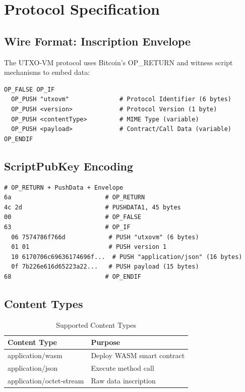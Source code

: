 \documentclass[a4paper,11pt]{article}
\begin{document}
\section{Protocol Specification}

\subsection{Wire Format: Inscription Envelope}

The UTXO-VM protocol uses Bitcoin's OP\_RETURN and witness script mechanisms to embed data:

\begin{lstlisting}[language={}, caption={Envelope Structure}]
OP_FALSE OP_IF
  OP_PUSH "utxovm"              # Protocol Identifier (6 bytes)
  OP_PUSH <version>             # Protocol Version (1 byte)
  OP_PUSH <contentType>         # MIME Type (variable)
  OP_PUSH <payload>             # Contract/Call Data (variable)
OP_ENDIF
\end{lstlisting}

\subsection{ScriptPubKey Encoding}

\begin{lstlisting}[language={}, caption={Example: Deploy Contract}]
# OP_RETURN + PushData + Envelope
6a                          # OP_RETURN
4c 2d                       # PUSHDATA1, 45 bytes
00                          # OP_FALSE
63                          # OP_IF
  06 7574786f766d            # PUSH "utxovm" (6 bytes)
  01 01                      # PUSH version 1
  10 6170706c69636174696f...  # PUSH "application/json" (16 bytes)
  0f 7b226e616d65223a22...   # PUSH payload (15 bytes)
68                          # OP_ENDIF
\end{lstlisting}

\subsection{Content Types}

\begin{table}[h]
\centering
\begin{tabular}{@{}ll@{}}
\toprule
\textbf{Content Type} & \textbf{Purpose} \\
\midrule
application/wasm & Deploy WASM smart contract \\
application/json & Execute method call \\
application/octet-stream & Raw data inscription \\
\bottomrule
\end{tabular}
\caption{Supported Content Types}
\end{table}
\end{document}
